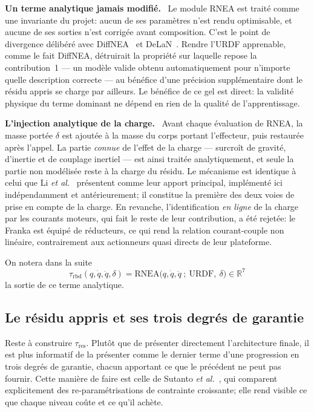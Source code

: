 \documentclass[a4paper, oneside]{article}
\newcommand{\parag}[1]{%
    \par\medskip\noindent\textbf{#1}\ \ignorespaces%
}
\newcommand{\q}{\ensuremath{q}}
\newcommand{\qd}{\ensuremath{\dot{q}}}
\newcommand{\qdd}{\ensuremath{\ddot{q}}}
\newcommand{\taurbd}{\ensuremath{\tau_{\mathrm{rbd}}}}
\newcommand{\taures}{\ensuremath{\tau_{\mathrm{res}}}}
\newcommand{\Rset}{\ensuremath{\mathbb{R}}}
\begin{document}
\parag{Un terme analytique jamais modifié.} Le module RNEA est traité comme
une invariante du projet: aucun de ses paramètres n'est rendu optimisable, et
aucune de ses sorties n'est corrigée avant composition. C'est le point de
divergence délibéré avec DiffNEA~\cite{sutanto2020} et DeLaN~\cite{lutter2019iclr}.
Rendre l'URDF apprenable, comme le fait DiffNEA, détruirait la propriété sur
laquelle repose la contribution~1 — un modèle valide obtenu automatiquement
pour n'importe quelle description correcte — au bénéfice d'une précision
supplémentaire dont le résidu appris se charge par ailleurs. Le bénéfice de ce
gel est direct: la validité physique du terme dominant ne dépend en rien de la
qualité de l'apprentissage.

\parag{L'injection analytique de la charge.} Avant chaque évaluation de
RNEA, la masse portée $\delta$ est ajoutée à la masse du corps portant
l'effecteur, puis restaurée après l'appel. La partie \emph{connue} de l'effet de
la charge — surcroît de gravité, d'inertie et de couplage inertiel — est ainsi
traitée analytiquement, et seule la partie non modélisée reste à la charge du
résidu. Le mécanisme est identique à celui que Li \emph{et al.}~\cite{li2025ral}
présentent comme leur apport principal, implémenté ici indépendamment et
antérieurement; il constitue la première des deux voies de prise en compte de
la charge. En revanche, l'identification \emph{en ligne} de la charge par les
courants moteurs, qui fait le reste de leur contribution, a été rejetée: le
Franka est équipé de réducteurs, ce qui rend la relation courant-couple non
linéaire, contrairement aux actionneurs quasi directs de leur plateforme.

On notera dans la suite
%
\begin{equation}
    \taurbd(\q,\qd,\qdd,\delta) = \mathrm{RNEA}\bigl(\q,\qd,\qdd~;~
    \mathrm{URDF},\ \delta\bigr) \in \Rset^{7}
    \label{eq:taurbd}
\end{equation}
%
la sortie de ce terme analytique.

\subsection{Le résidu appris et ses trois degrés de garantie}
\label{sec:residu}

Reste à construire $\taures$. Plutôt que de présenter directement
l'architecture finale, il est plus informatif de la présenter comme le dernier
terme d'une progression en trois degrés de garantie, chacun apportant ce que le
précédent ne peut pas fournir. Cette manière de faire est celle de
Sutanto \emph{et al.}~\cite{sutanto2020}, qui comparent explicitement des
re-paramétrisations de contrainte croissante; elle rend visible ce que chaque
niveau coûte et ce qu'il achète.
\end{document}
